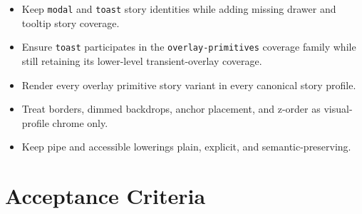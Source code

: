 \begin{itemize}
\tightlist
\item
  Keep \texttt{m\allowbreak{}o\allowbreak{}d\allowbreak{}a\allowbreak{}l} and \texttt{t\allowbreak{}o\allowbreak{}a\allowbreak{}s\allowbreak{}t} story identities while adding missing drawer and tooltip story coverage.
\item
  Ensure \texttt{t\allowbreak{}o\allowbreak{}a\allowbreak{}s\allowbreak{}t} participates in the \texttt{o\allowbreak{}v\allowbreak{}e\allowbreak{}r\allowbreak{}l\allowbreak{}a\allowbreak{}y\allowbreak{}-\allowbreak{}p\allowbreak{}r\allowbreak{}i\allowbreak{}m\allowbreak{}i\allowbreak{}t\allowbreak{}i\allowbreak{}v\allowbreak{}e\allowbreak{}s} coverage family while still retaining its lower-level transient-overlay coverage.
\item
  Render every overlay primitive story variant in every canonical story profile.
\item
  Treat borders, dimmed backdrops, anchor placement, and z-order as visual-profile chrome only.
\item
  Keep pipe and accessible lowerings plain, explicit, and semantic-preserving.
\end{itemize}

\section{Acceptance Criteria}\label{record-102-acceptance-criteria}

